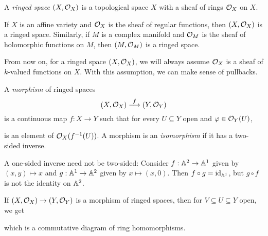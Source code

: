 \begin{definition}
  A \emph{ringed space} $(X, \mathcal{O}_X)$
  is a topological space
  $X$ with a sheaf of rings $\mathcal{O}_X$
  on $X$.
\end{definition}

\begin{example}
  If $X$ is an affine variety and
  $\mathcal{O}_X$ is the sheaf of regular functions,
  then $(X, \mathcal{O}_X)$ is a ringed space.
  Similarly, if $M$ is a complex manifold
  and $\mathcal{O}_M$ is the sheaf of holomorphic
  functions on $M$, then
  $(M, \mathcal{O}_M)$ is a ringed space.
\end{example}

\begin{remark}
  From now on, for a ringed space
  $(X, \mathcal{O}_X)$, we will always assume
  $\mathcal{O}_X$ is a sheaf of $k$-valued
  functions on $X$. With this assumption,
  we can make sense of pullbacks.
\end{remark}

\begin{definition}
  A \emph{morphism} of ringed spaces
  \[
    (X, \mathcal{O}_X) \overset{f}{\longrightarrow} (Y, \mathcal{O}_Y)
  \]
  is a continuous map $f : X \to Y$ such
  that for every $U \subseteq Y$ open and
  $\varphi \in \mathcal{O}_Y(U)$,
  \begin{center}
  \end{center}
  is an element of $\mathcal{O}_X(f^{-1}(U))$.
  A morphism is an \emph{isomorphism}
  if it has a two-sided inverse.
\end{definition}

\begin{remark}
  A one-sided inverse need not be
  two-sided: Consider
  $f : \mathbb{A}^2 \to \mathbb{A}^1$
  given by $(x, y) \mapsto x$ and
  $g : \mathbb{A}^1 \to \mathbb{A}^2$
  given by $x \mapsto (x, 0)$. Then
  $f \circ g = \operatorname{id}_{\mathbb{A}^1}$, but
  $g \circ f$ is not
  the identity on $\mathbb{A}^2$.
\end{remark}

\begin{remark}
  If $(X, \mathcal{O}_X) \to (Y, \mathcal{O}_Y)$ is a
  morphism of ringed spaces, then
  for $V \subseteq U \subseteq Y$ open,
  we get
  \begin{center}
  \end{center}
  which is a commutative diagram of
  ring homomorphisms.
\end{remark}

